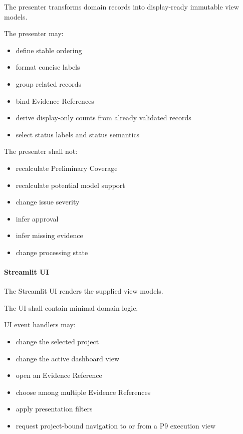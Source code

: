 The presenter transforms domain records into display-ready immutable view models.

The presenter may:

\begin{itemize}
\tightlist
\item
  define stable ordering
\item
  format concise labels
\item
  group related records
\item
  bind Evidence References
\item
  derive display-only counts from already validated records
\item
  select status labels and status semantics
\end{itemize}

The presenter shall not:

\begin{itemize}
\tightlist
\item
  recalculate Preliminary Coverage
\item
  recalculate potential model support
\item
  change issue severity
\item
  infer approval
\item
  infer missing evidence
\item
  change processing state
\end{itemize}

\hypertarget{streamlit-ui}{%
\paragraph{Streamlit UI}\label{streamlit-ui}}

The Streamlit UI renders the supplied view models.

The UI shall contain minimal domain logic.

UI event handlers may:

\begin{itemize}
\tightlist
\item
  change the selected project
\item
  change the active dashboard view
\item
  open an Evidence Reference
\item
  choose among multiple Evidence References
\item
  apply presentation filters
\item
  request project-bound navigation to or from a P9 execution view
\end{itemize}

